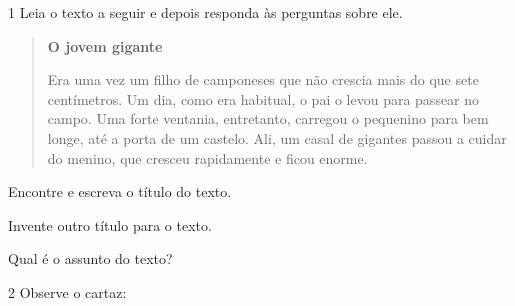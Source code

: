 \num{1} Leia o texto a seguir e depois responda às perguntas sobre ele. 

\begin{quote}
\textbf{O jovem gigante}

Era uma vez um filho de camponeses que não crescia mais do que sete
centímetros. Um dia, como era habitual, o pai o levou para passear no
campo. Uma forte ventania, entretanto, carregou o pequenino para bem
longe, até a porta de um castelo. Ali, um casal de gigantes passou a
cuidar do menino, que cresceu rapidamente e ficou enorme.

\end{quote}

\begin{escolha}
\item Encontre e escreva o título do texto.


\item Invente outro título para o texto.


\item Qual é o assunto do texto?

\end{escolha}

\pagebreak
\num{2} Observe o cartaz:


